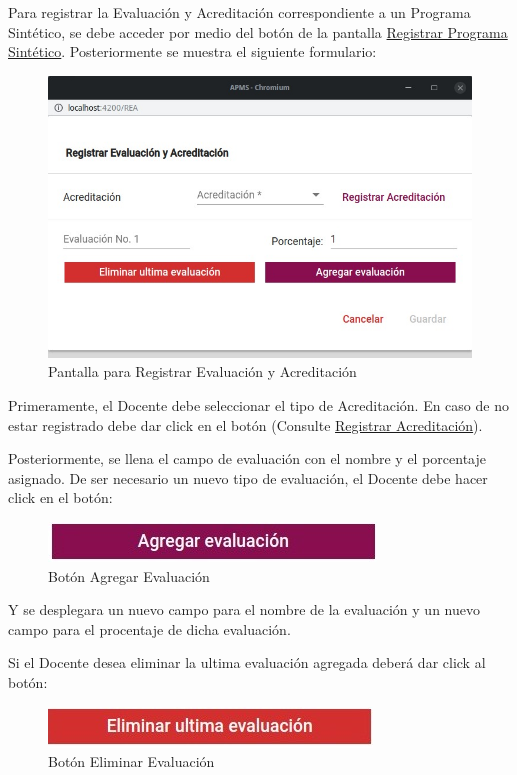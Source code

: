 Para registrar la Evaluación y Acreditación correspondiente a un Programa Sintético, se debe acceder por medio del botón  de la pantalla \hyperlink{RegistrarPS}{Registrar Programa Sintético}. Posteriormente se muestra el siguiente formulario: 


\begin{figure}[H]
    \centering
    \hypertarget{RegEyA}{\includegraphics[width=0.5\linewidth]{images/SP6/8.jpeg}}
    \caption{Pantalla para Registrar Evaluación y Acreditación}
\end{figure}

Primeramente, el Docente debe seleccionar el tipo de Acreditación. En caso de no estar registrado debe dar click en el botón (Consulte \hyperlink{RegA}{Registrar Acreditación}).

Posteriormente, se llena el campo de evaluación con el nombre y el porcentaje asignado. De ser necesario un nuevo tipo de evaluación, el Docente debe hacer click en el botón:

\begin{figure}[!h]
    \centering
    \includegraphics[width=0.3\linewidth]{images/SP6/BotonEval.jpeg}
    \caption{Botón Agregar Evaluación} 
\end{figure}

Y se desplegara un nuevo campo para el nombre de la evaluación y un nuevo campo para el procentaje de dicha evaluación.

Si el Docente desea eliminar la ultima evaluación agregada deberá dar click al botón: 


\begin{figure}[H]
    \centering
    \includegraphics[width=0.3\linewidth]{images/SP6/BotonEliEval.jpeg}
    \caption{Botón Eliminar Evaluación} 
\end{figure}

